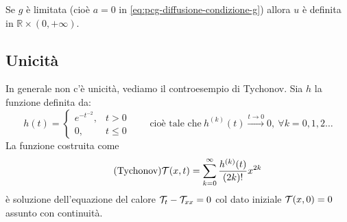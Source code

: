 
\begin{oss}
    Se $g$ è limitata (cioè $a=0$ in \eqref{eq:pcg-diffusione-condizione-g}) allora $u$ è definita in $\mathbb{R} \times (0,+\infty)$.
\end{oss}
\subsection{Unicità}

In generale non c'è unicità, vediamo il controesempio di Tychonov. Sia $h$ la funzione definita da:
\begin{equation*}
    h(t) =
    \begin{cases}
        e^{-t^{-2}}, & t >0         \\
        0,           & t\leq 0
    \end{cases} \qquad \text{cioè tale che} \ h^{(k)}(t)\xrightarrow{t\rightarrow 0} 0,\ \forall k=0,1,2\dotsc
\end{equation*}
La funzione costruita come
\begin{equation}
    \tag{Tychonov}
    \mathcal{T} (x,t) =\sum\limits ^{\infty }_{k=0}\frac{h^{(k)}(t)}{(2k) !} x^{2k}
\end{equation}
è soluzione dell'equazione del calore $\mathcal{T} _{t} -\mathcal{T} _{xx} =0$ col dato iniziale $\mathcal{T} (x,0)=0$ assunto con continuità.
